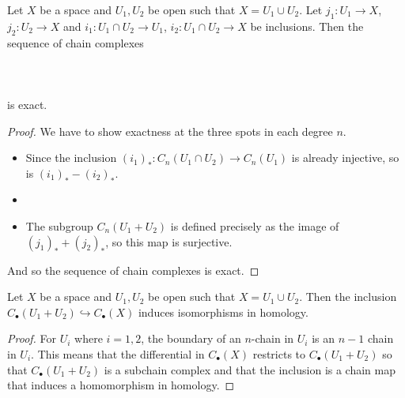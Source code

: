 \documentclass[a4paper]{article}
\begin{document}
\begin{prp}{}{} Let $X$ be a space and $U_1,U_2$ be open such that $X=U_1\cup U_2$. Let $j_1:U_1\to X$, $j_2:U_2\to X$ and $i_1:U_1\cap U_2\to U_1$, $i_2:U_1\cap U_2\to X$ be inclusions. Then the sequence of chain complexes \\~\\
\\~\\
is exact. \tcbline
\begin{proof}
We have to show exactness at the three spots in each degree $n$. 
\begin{itemize}
\item Since the inclusion $(i_1)_\ast:C_n(U_1\cap U_2)\to C_n(U_1)$ is already injective, so is $(i_1)_\ast-(i_2)_\ast$. 
\item 
\item The subgroup $C_n(U_1+U_2)$ is defined precisely as the image of $(j_1)_\ast+(j_2)_\ast$, so this map is surjective. 
\end{itemize}
And so the sequence of chain complexes is exact. 
\end{proof}
\end{prp}

\begin{prp}{}{} Let $X$ be a space and $U_1,U_2$ be open such that $X=U_1\cup U_2$. Then the inclusion $C_\bullet(U_1+U_2)\hookrightarrow C_\bullet(X)$ induces isomorphisms in homology. \tcbline
\begin{proof}
For $U_i$ where $i=1,2$, the boundary of an $n$-chain in $U_i$ is an $n-1$ chain in $U_i$. This means that the differential in $C_\bullet(X)$ restricts to $C_\bullet(U_1+U_2)$ so that $C_\bullet(U_1+U_2)$ is a subchain complex and that the inclusion is a chain map that induces a homomorphism in homology. 
\end{proof}
\end{prp}
\end{document}

